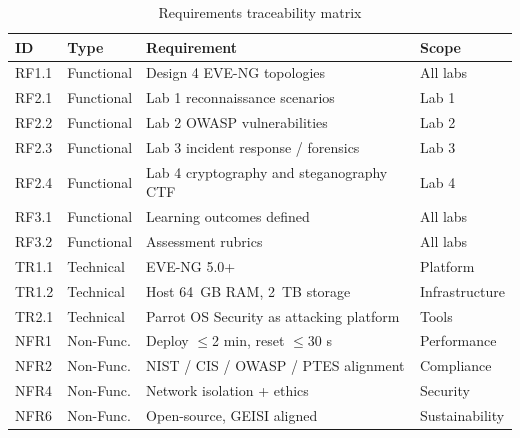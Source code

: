 \medskip

\begin{table}[H]
  \centering
  \footnotesize
  \setlength{\tabcolsep}{3pt}
  \renewcommand{\arraystretch}{1.0}
  \begin{tabularx}{\textwidth}{l l X l}
    \toprule
    \textbf{ID} & \textbf{Type} & \textbf{Requirement} & \textbf{Scope} \\
    \midrule
    RF1.1  & Functional  & Design 4 EVE-NG topologies              & All labs       \\
    RF2.1  & Functional  & Lab 1 reconnaissance scenarios          & Lab 1          \\
    RF2.2  & Functional  & Lab 2 OWASP vulnerabilities             & Lab 2          \\
    RF2.3  & Functional  & Lab 3 incident response / forensics     & Lab 3          \\
    RF2.4  & Functional  & Lab 4 cryptography and steganography CTF & Lab 4         \\
    RF3.1  & Functional  & Learning outcomes defined               & All labs       \\
    RF3.2  & Functional  & Assessment rubrics                      & All labs       \\
    TR1.1  & Technical   & EVE-NG 5.0+                             & Platform       \\
    TR1.2  & Technical   & Host 64~GB RAM, 2~TB storage            & Infrastructure \\
    TR2.1  & Technical   & Parrot OS Security as attacking platform & Tools         \\
    NFR1   & Non-Func.   & Deploy $\leq$2 min, reset $\leq$30 s   & Performance    \\
    NFR2   & Non-Func.   & NIST / CIS / OWASP / PTES alignment    & Compliance     \\
    NFR4   & Non-Func.   & Network isolation + ethics              & Security       \\
    NFR6   & Non-Func.   & Open-source, GEISI aligned              & Sustainability \\
    \bottomrule
  \end{tabularx}
  \caption[Requirements traceability]{Requirements traceability matrix}
  \label{tab:requirements_traceability}
\end{table}

